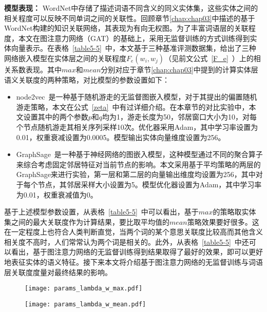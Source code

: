 \textbf{模型表现：}
WordNet中存储了描述词语不同含义的同义实体集，这些实体之间的相关程度可以反映不同单词之间的关联性。回顾章节\ref{chap:chap03}中描述的基于WordNet构建的知识关联网络，其表现为有向无权图。为了丰富词语层的关联程度，本文在图注意力网络（GAT）的基础上，采用无监督训练的方式训练得到实体向量表示。在表格~\ref{table5-5}~中，本文基于三种基准评测数据集，给出了三种网络嵌入模型在实体层之间的关联程度$F_e(w_i, w_j)$（见前文公式~\ref{F_e}~）上的相关系数表现。其中$max$和$mean$分别对应于章节\ref{chap:chap03}中提到的计算实体层语义关联度的两种策略，对比模型的参数设置如下：
\begin{itemize}
    \item node2vec~\cite{kdd/GroverL16}是一种基于随机游走的无监督图嵌入模型，对于其提出的偏置随机游走策略，本文在公式~\ref{zeta}~中有过详细介绍。在本章节的对比实验中，本文设置其中的两个参数$p$和$q$均为1，游走长度为50，邻居窗口大小为10，对每个节点随机游走其相关序列采样10次。优化器采用Adam，其中学习率设置为0.01，权重衰减设置为0.0005。模型输出实体向量维度设置为256。
    \item GraphSage~\cite{nips/HamiltonYL17}是一种基于神经网络的图嵌入模型，这种模型通过不同的聚合算子来综合考虑固定邻居特征对当前节点的影响。本文采用基于平均策略的两层的GraphSage来进行实验，第一层和第二层的向量输出维度均设置为256，其中对于每个节点，其邻居采样大小设置为5。模型优化器设置为Adam，其中学习率为0.01，权重衰减值为0。
\end{itemize}

基于上述模型参数设置，从表格~\ref{table5-5}~中可以看出，基于$max$的策略取实体集之间的最大关联度作为计算结果，要比取平均值的$mean$策略效果要好很多。这在一定程度上也符合人类判断直觉，当两个词的某个意思关联度比较高而其他含义相关度不高时，人们常常认为两个词是相关的。此外，从表格~\ref{table5-5}~中还可以看出，基于图注意力网络的无监督训练得到结果取得了最好的效果，即可以更好地表征实体的语义特征。接下来本文将介绍基于图注意力网络的无监督训练与词语层关联度度量对最终结果的影响。

\begin{figure}[htbp]
    \begin{minipage}{0.48\textwidth}
      \centering
      \texttt{[image: params\_lambda\_w\_max.pdf]}
      \label{fig:lambda_w_max}
    \end{minipage}\hfill
    \begin{minipage}{0.48\textwidth}
      \centering
      \texttt{[image: params\_lambda\_w\_mean.pdf]}
      \label{fig:lambda_w_mean}
    \end{minipage}
    \label{fig:wordnet_sr}
\end{figure}

